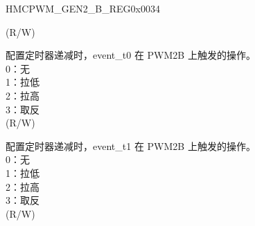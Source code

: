 \begin{register}{H}{MCPWM\_GEN2\_B\_REG}{0x0034}
\begin{regdesc}
\begin{reglist}
(R/W)
\label{fielddesc:MCPWMGEN2BDT0}\item [MCPWM\_GEN2\_B\_DT0] 配置定时器递减时，event\_t0 在 PWM2B 上触发的操作。\\
0：无\\
1：拉低\\
2：拉高\\
3：取反 \\
(R/W)
\label{fielddesc:MCPWMGEN2BDT1}\item [MCPWM\_GEN2\_B\_DT1] 配置定时器递减时，event\_t1 在 PWM2B 上触发的操作。\\
0：无\\
1：拉低\\
2：拉高\\
3：取反 \\
(R/W)
\end{reglist}\end{regdesc}
\end{register}


